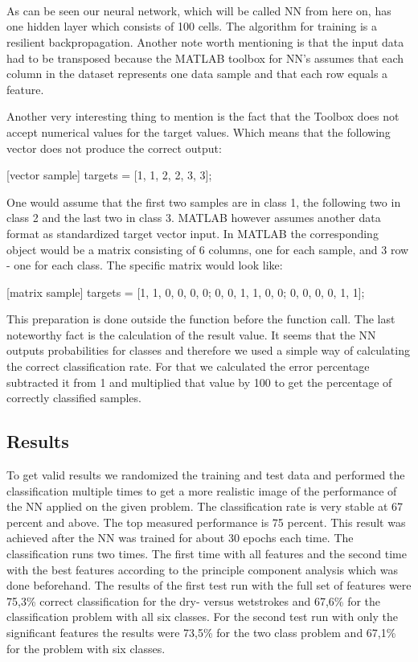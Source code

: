 \documentclass[subfigure,epsfig,fleqn,float,ausarbeitung]{scrartcl}
\begin{document}
~\\ ~\\ ~\\

As can be seen our neural network, which will be called NN from here on, has one hidden layer which consists of 100 cells. The algorithm for training is a resilient backpropagation. Another note worth mentioning is that the input data had to be transposed because the MATLAB toolbox for NN’s assumes that each column in the dataset represents one data sample and that each row equals a feature.

Another very interesting thing to mention is the fact that the Toolbox does not accept numerical values for the target values. Which means that the following vector does not produce the correct output:

[vector sample]
targets = [1, 1, 2, 2, 3, 3];

One would assume that the first two samples are in class 1, the following two in class 2 and the last two in class 3. MATLAB however assumes another data format as standardized target vector input. In MATLAB the corresponding object would be a matrix consisting of 6 columns, one for each sample, and 3 row - one for each class. The specific matrix would look like:

[matrix sample]
targets = 	[1, 1, 0, 0, 0, 0; 
0, 0, 1, 1, 0, 0; 
0, 0, 0, 0, 1, 1];

This preparation is done outside the function before the function call. The last noteworthy fact is the calculation of the result value. It seems that the NN outputs probabilities for classes and therefore we used a simple way of calculating the correct classification rate. For that we calculated the error percentage subtracted it from 1 and multiplied that value by 100 to get the percentage of correctly classified samples.

\subsection{Results}

To get valid results we randomized the training and test data and performed the classification multiple times to get a more realistic image of the performance of the NN applied on the given problem. The classification rate is very stable at 67 percent and above. The top measured performance is 75 percent. This result was achieved after the NN was trained for about 30 epochs each time. 
The classification runs two times. The first time with all features and the second time with the best features according to the principle component analysis which was done beforehand. The results of the first test run with the full set of features were 75,3\% correct classification for the dry- versus wetstrokes and 67,6\% for the classification problem with all six classes. 
For the second test run with only the significant features the results were 73,5\% for the two class problem and 67,1\% for the problem with six classes.
\end{document}
